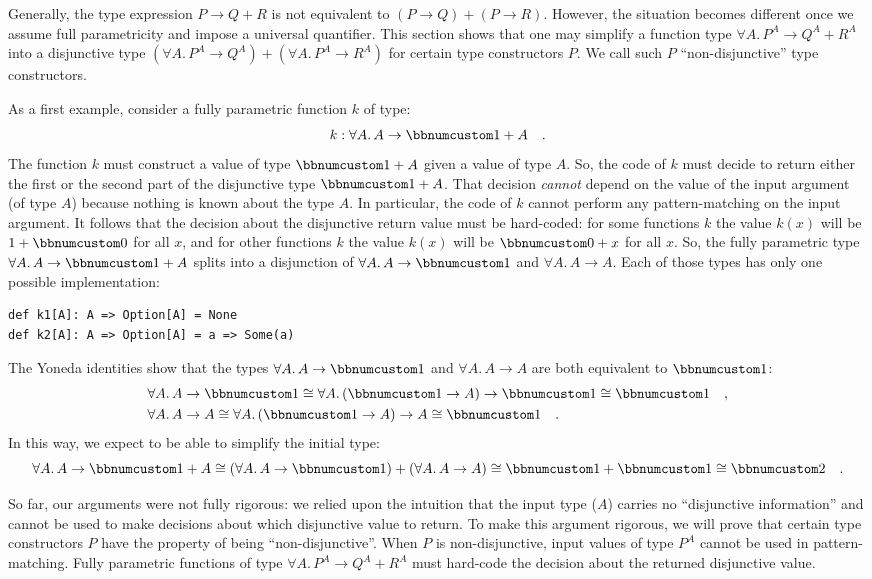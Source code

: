 Generally, the type expression $P\rightarrow Q+R$ is not equivalent
to $(P\rightarrow Q)+(P\rightarrow R)$. However, the situation becomes
different once we assume full parametricity and impose a universal
quantifier. This section shows that one may simplify a function type
$\forall A.\,P^{A}\rightarrow Q^{A}+R^{A}$ into a disjunctive type
$(\forall A.\,P^{A}\rightarrow Q^{A})+(\forall A.\,P^{A}\rightarrow R^{A})$
for certain type constructors $P$. We call such $P$ \textsf{``}non-disjunctive\textsf{''}
type constructors.

As a first example, consider a fully parametric function $k$ of type:
\[
k:\forall A.\,A\rightarrow\bbnum 1+A\quad.
\]
The function $k$ must construct a value of type $\bbnum 1+A$ given
a value of type $A$. So, the code of $k$ must decide to return either
the first or the second part of the disjunctive type $\bbnum 1+A$.
That decision \emph{cannot} depend on the value of the input argument
(of type $A$) because nothing is known about the type $A$. In particular,
the code of $k$ cannot perform any pattern-matching on the input
argument. It follows that the decision about the disjunctive return
value must be hard-coded: for some functions $k$ the value $k(x)$
will be $1+\bbnum 0$ for all $x$, and for other functions $k$ the
value $k(x)$ will be $\bbnum 0+x$ for all $x$. So, the fully parametric
type $\forall A.\,A\rightarrow\bbnum 1+A$ splits into a disjunction
of $\forall A.\,A\rightarrow\bbnum 1$ and $\forall A.\,A\rightarrow A$.
Each of those types has only one possible implementation:
\begin{lstlisting}
def k1[A]: A => Option[A] = None
def k2[A]: A => Option[A] = a => Some(a)
\end{lstlisting}
The Yoneda identities show that the types $\forall A.\,A\rightarrow\bbnum 1$
and $\forall A.\,A\rightarrow A$ are both equivalent to $\bbnum 1$:
\begin{align*}
 & \forall A.\,A\rightarrow\bbnum 1\cong\forall A.\,(\bbnum 1\rightarrow A)\rightarrow\bbnum 1\cong\bbnum 1\quad,\\
 & \forall A.\,A\rightarrow A\cong\forall A.\,(\bbnum 1\rightarrow A)\rightarrow A\cong\bbnum 1\quad.
\end{align*}
In this way, we expect to be able to simplify the initial type:
\[
\forall A.\,A\rightarrow\bbnum 1+A\cong(\forall A.\,A\rightarrow\bbnum 1)+(\forall A.\,A\rightarrow A)\cong\bbnum 1+\bbnum 1\cong\bbnum 2\quad.
\]

So far, our arguments were not fully rigorous: we relied upon the
intuition that the input type ($A$) carries no \textsf{``}disjunctive information\textsf{''}
and cannot be used to make decisions about which disjunctive value
to return. To make this argument rigorous, we will prove that certain
type constructors $P$ have the property of being \textsf{``}non-disjunctive\textsf{''}.
When $P$ is non-disjunctive, input values of type $P^{A}$ cannot
be used in pattern-matching. Fully parametric functions of type $\forall A.\,P^{A}\rightarrow Q^{A}+R^{A}$
must hard-code the decision about the returned disjunctive value.

